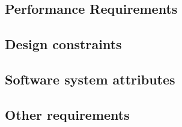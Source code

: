 \subsection{Performance Requirements}

\subsection{Design constraints}

\subsection{Software system attributes}

\subsection{Other requirements}
